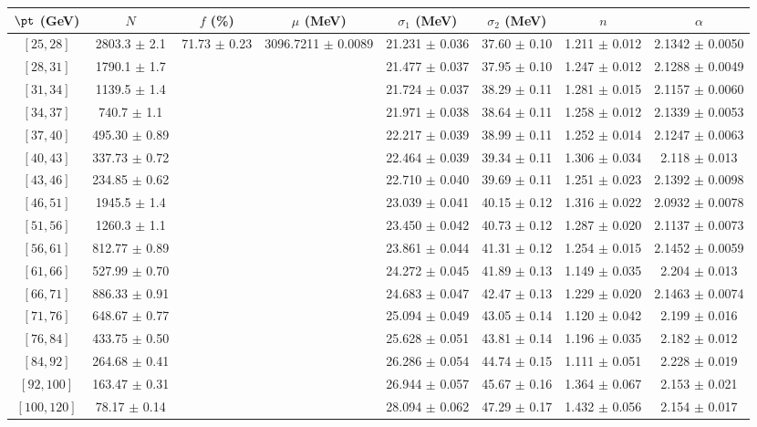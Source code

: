\begin{tabular}{c||c|c|c|c|c|c|c}
$\pt$ (GeV) & $N$ & $f$ (\%) & $\mu$ (MeV) & $\sigma_1$ (MeV) & $\sigma_2$ (MeV) & $n$ & $\alpha$ \\
\hline
$[25, 28]$ & 2803.3 $\pm$ 2.1 & \multirow{17}{*}{71.73 $\pm$ 0.23} & \multirow{17}{*}{3096.7211 $\pm$ 0.0089} & 21.231 $\pm$ 0.036 & 37.60 $\pm$ 0.10 & 1.211 $\pm$ 0.012 & 2.1342 $\pm$ 0.0050\\
$[28, 31]$ & 1790.1 $\pm$ 1.7 &  &  & 21.477 $\pm$ 0.037 & 37.95 $\pm$ 0.10 & 1.247 $\pm$ 0.012 & 2.1288 $\pm$ 0.0049\\
$[31, 34]$ & 1139.5 $\pm$ 1.4 &  &  & 21.724 $\pm$ 0.037 & 38.29 $\pm$ 0.11 & 1.281 $\pm$ 0.015 & 2.1157 $\pm$ 0.0060\\
$[34, 37]$ & 740.7 $\pm$ 1.1 &  &  & 21.971 $\pm$ 0.038 & 38.64 $\pm$ 0.11 & 1.258 $\pm$ 0.012 & 2.1339 $\pm$ 0.0053\\
$[37, 40]$ & 495.30 $\pm$ 0.89 &  &  & 22.217 $\pm$ 0.039 & 38.99 $\pm$ 0.11 & 1.252 $\pm$ 0.014 & 2.1247 $\pm$ 0.0063\\
$[40, 43]$ & 337.73 $\pm$ 0.72 &  &  & 22.464 $\pm$ 0.039 & 39.34 $\pm$ 0.11 & 1.306 $\pm$ 0.034 & 2.118 $\pm$ 0.013\\
$[43, 46]$ & 234.85 $\pm$ 0.62 &  &  & 22.710 $\pm$ 0.040 & 39.69 $\pm$ 0.11 & 1.251 $\pm$ 0.023 & 2.1392 $\pm$ 0.0098\\
$[46, 51]$ & 1945.5 $\pm$ 1.4 &  &  & 23.039 $\pm$ 0.041 & 40.15 $\pm$ 0.12 & 1.316 $\pm$ 0.022 & 2.0932 $\pm$ 0.0078\\
$[51, 56]$ & 1260.3 $\pm$ 1.1 &  &  & 23.450 $\pm$ 0.042 & 40.73 $\pm$ 0.12 & 1.287 $\pm$ 0.020 & 2.1137 $\pm$ 0.0073\\
$[56, 61]$ & 812.77 $\pm$ 0.89 &  &  & 23.861 $\pm$ 0.044 & 41.31 $\pm$ 0.12 & 1.254 $\pm$ 0.015 & 2.1452 $\pm$ 0.0059\\
$[61, 66]$ & 527.99 $\pm$ 0.70 &  &  & 24.272 $\pm$ 0.045 & 41.89 $\pm$ 0.13 & 1.149 $\pm$ 0.035 & 2.204 $\pm$ 0.013\\
$[66, 71]$ & 886.33 $\pm$ 0.91 &  &  & 24.683 $\pm$ 0.047 & 42.47 $\pm$ 0.13 & 1.229 $\pm$ 0.020 & 2.1463 $\pm$ 0.0074\\
$[71, 76]$ & 648.67 $\pm$ 0.77 &  &  & 25.094 $\pm$ 0.049 & 43.05 $\pm$ 0.14 & 1.120 $\pm$ 0.042 & 2.199 $\pm$ 0.016\\
$[76, 84]$ & 433.75 $\pm$ 0.50 &  &  & 25.628 $\pm$ 0.051 & 43.81 $\pm$ 0.14 & 1.196 $\pm$ 0.035 & 2.182 $\pm$ 0.012\\
$[84, 92]$ & 264.68 $\pm$ 0.41 &  &  & 26.286 $\pm$ 0.054 & 44.74 $\pm$ 0.15 & 1.111 $\pm$ 0.051 & 2.228 $\pm$ 0.019\\
$[92, 100]$ & 163.47 $\pm$ 0.31 &  &  & 26.944 $\pm$ 0.057 & 45.67 $\pm$ 0.16 & 1.364 $\pm$ 0.067 & 2.153 $\pm$ 0.021\\
$[100, 120]$ & 78.17 $\pm$ 0.14 &  &  & 28.094 $\pm$ 0.062 & 47.29 $\pm$ 0.17 & 1.432 $\pm$ 0.056 & 2.154 $\pm$ 0.017\\
\end{tabular}
